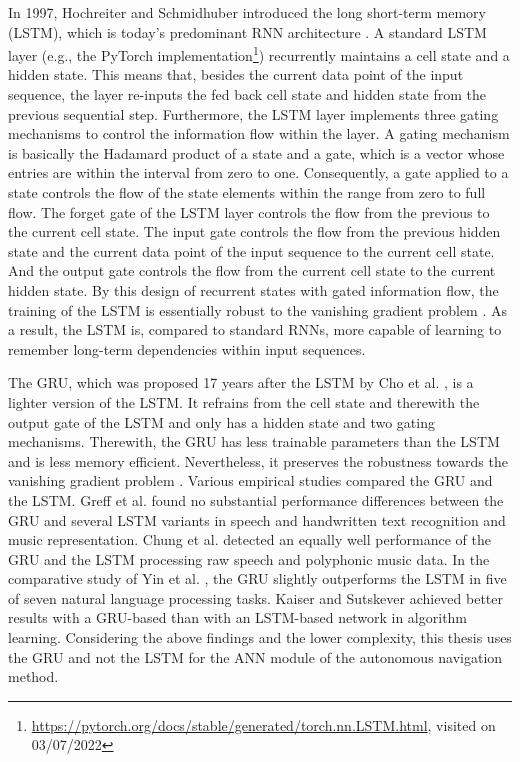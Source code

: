 In 1997, Hochreiter and Schmidhuber \cite{Hochreiter1997} 
introduced the long short-term memory (LSTM), 
which is today's predominant RNN architecture \cite{schmidhuber_2021}. 
A standard LSTM layer (e.g., the PyTorch implementation\footnote{
    \url{https://pytorch.org/docs/stable/generated/torch.nn.LSTM.html}, visited on 03/07/2022
}) 
recurrently maintains a cell state and a hidden state. 
This means that, besides the current data point of the input sequence, 
the layer re-inputs the fed back cell state and hidden state 
from the previous sequential step. 
Furthermore, the LSTM layer implements three gating mechanisms 
to control the information flow within the layer. 
A gating mechanism is basically the Hadamard product 
of a state and a gate, 
which is a vector whose entries are within the interval from zero to one. 
Consequently, a gate applied to a state controls the flow 
of the state elements within the range from zero to full flow. 
The forget gate of the LSTM layer controls the flow 
from the previous to the current cell state. 
The input gate controls the flow from the previous hidden state 
and the current data point of the input sequence 
to the current cell state. 
And the output gate controls the flow from the current cell state 
to the current hidden state. 
By this design of recurrent states with gated information flow, 
the training of the LSTM is essentially robust 
to the vanishing gradient problem \cite{pascanu2013difficulty}. 
As a result, the LSTM is, compared to standard RNNs, 
more capable of learning to remember long-term dependencies 
within input sequences.


The GRU, which was proposed 17 years after the LSTM by 
Cho et al. \cite{Cho2014}, 
is a lighter version of the LSTM. 
It refrains from the cell state and therewith the output gate of the LSTM 
and only has a hidden state and two gating mechanisms. 
Therewith, the GRU has less trainable parameters 
than the LSTM and is less memory efficient. 
Nevertheless, it preserves the robustness towards 
the vanishing gradient problem \cite{ICE2020}. 
Various empirical studies compared the GRU and the LSTM. 
Greff et al. \cite{Greff2017} found no substantial performance 
differences between the GRU and several LSTM variants 
in speech and handwritten text recognition and music representation. 
Chung et al. \cite{Chung2014} detected an equally well performance 
of the GRU and the LSTM processing raw speech and polyphonic music data. 
In the comparative study of Yin et al. \cite{Yin2017}, 
the GRU slightly outperforms the LSTM 
in five of seven natural language processing tasks. 
Kaiser and Sutskever \cite{Kaiser2015} achieved better 
results with a GRU-based than with an LSTM-based network 
in algorithm learning. 
Considering the above findings and the lower complexity, 
this thesis uses the GRU and not the LSTM 
for the ANN module of the autonomous navigation method.




